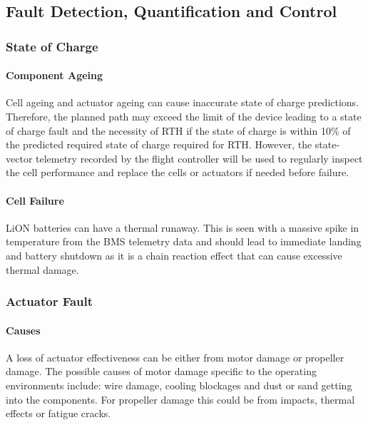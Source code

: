 \subsection{Fault Detection, Quantification and Control}\label{sub_section:tgt_fault_detection}

\subsubsection{State of Charge}\label{sub_sub_section:tgt_SOC}
\paragraph{Component Ageing}
Cell ageing and actuator ageing can cause inaccurate state of charge predictions. Therefore, the planned path may exceed the limit of the device leading to a state of charge fault and the necessity of \gls{RTH} if the state of charge is within 10\% of the predicted required state of charge required for \gls{RTH}. However, the state-vector telemetry recorded by the flight controller will be used to regularly inspect the cell performance and replace the cells or actuators if needed before failure.
\paragraph{Cell Failure}
\gls{LiON} batteries can have a thermal runaway. This is seen with a massive spike in temperature from the \gls{BMS} telemetry data and should lead to immediate landing and battery shutdown as it is a chain reaction effect that can cause excessive thermal damage\cite{LiONRunaway}.

\subsubsection{Actuator Fault}\label{sub_sub_section:tgt_actuator_fault}
\paragraph{Causes}
A loss of actuator effectiveness can be either from motor damage or propeller damage. The possible causes of motor damage specific to the operating environments include: wire damage, cooling blockages and dust or sand getting into the components. For propeller damage this could be from impacts, thermal effects or fatigue cracks.
